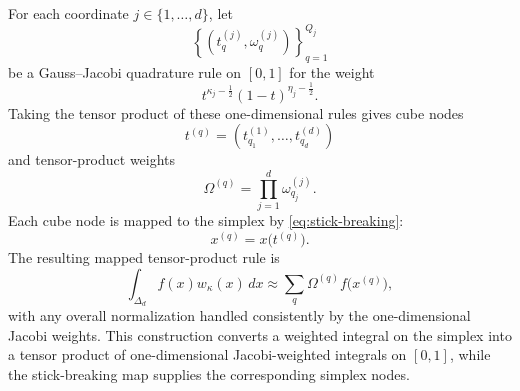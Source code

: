 \documentclass[11pt]{article}
\begin{document}
For each coordinate $j\in\{1,\dots,d\}$, let
\begin{equation}
  \left\{\left(t_q^{(j)},\omega_q^{(j)}\right)\right\}_{q=1}^{Q_j}
\end{equation}
be a Gauss--Jacobi quadrature rule on $[0,1]$ for the weight
\begin{equation}
  t^{\kappa_j-\frac12}(1-t)^{\eta_j-\frac12}.
\end{equation}
\noindent
Taking the tensor product of these one-dimensional rules gives cube nodes
\begin{equation}
  t^{(q)}
  = \left(t_{q_1}^{(1)},\dots,t_{q_d}^{(d)}\right)
\end{equation}
and tensor-product weights
\begin{equation}
  \Omega^{(q)}
  = \prod_{j=1}^d \omega_{q_j}^{(j)}.
\end{equation}
\noindent
Each cube node is mapped to the simplex by \eqref{eq:stick-breaking}:
\begin{equation}
  x^{(q)} = x\bigl(t^{(q)}\bigr).
\end{equation}
The resulting mapped tensor-product rule is
\begin{equation}
  \int_{\Delta_d} f(x)w_{\kappa}(x)\,dx
  \approx
  \sum_q \Omega^{(q)} f\bigl(x^{(q)}\bigr),
  \label{eq:mapped-quadrature}
\end{equation}
with any overall normalization handled consistently by the one-dimensional Jacobi weights.
\newline
\newline
\noindent
This construction converts a weighted integral on the simplex into a tensor product of one-dimensional Jacobi-weighted integrals on $[0,1]$, while the stick-breaking map supplies the corresponding simplex nodes.
\end{document}
